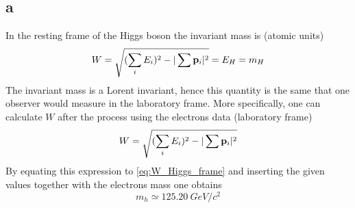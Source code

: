 \subsection*{a}
In the resting frame of the Higgs boson the invariant mass is (atomic units)
\begin{equation}
    W = \sqrt{(\sum_i E_i)^2 - |\sum \mathbf{p}_i|^2} = E_H = m_H
    \label{eq:W_Higgs_frame}
\end{equation}
The invariant mass is a Lorent invariant, hence this quantity is the same that one observer would measure in the laboratory frame. 
More specifically, one can calculate $W$ after the process using the electrons data (laboratory frame)
\begin{equation*}
    W = \sqrt{(\sum_i E_i)^2 - |\sum \mathbf{p}_i|^2}
\end{equation*}
By equating this expression to \ref{eq:W_Higgs_frame} and inserting the given values together with the electrons mass one obtains
\begin{equation*}
    m_h \simeq 125.20~GeV/c^2
\end{equation*}


